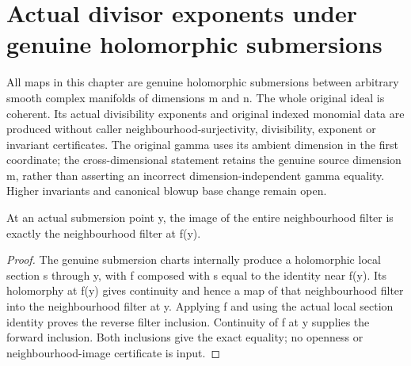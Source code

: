\section{Actual divisor exponents under genuine holomorphic submersions}

All maps in this chapter are genuine holomorphic submersions between arbitrary smooth complex manifolds of dimensions m and n. The whole original ideal is coherent. Its actual divisibility exponents and original indexed monomial data are produced without caller neighbourhood-surjectivity, divisibility, exponent or invariant certificates. The original gamma uses its ambient dimension in the first coordinate; the cross-dimensional statement retains the genuine source dimension m, rather than asserting an incorrect dimension-independent gamma equality. Higher invariants and canonical blowup base change remain open.

\begin{lemma}\label{hir:submersion-actual-map-nhds}
\leanok
At an actual submersion point y, the image of the entire neighbourhood filter is exactly the neighbourhood filter at f(y).
\end{lemma}
\begin{proof}
The genuine submersion charts internally produce a holomorphic local section s through y, with f composed with s equal to the identity near f(y). Its holomorphy at f(y) gives continuity and hence a map of that neighbourhood filter into the neighbourhood filter at y. Applying f and using the actual local section identity proves the reverse filter inclusion. Continuity of f at y supplies the forward inclusion. Both inclusions give the exact equality; no openness or neighbourhood-image certificate is input.
\end{proof}

